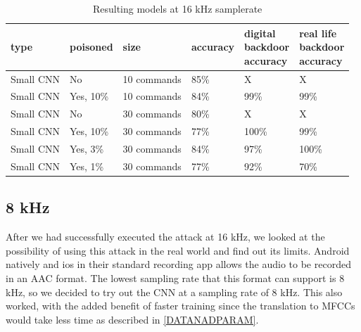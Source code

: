 \documentclass{report}
\theoremstyle{definition}
\theoremstyle{remark}
\begin{document}
\begin{table}[!hbt]
\centering
\begin{tabular}{|l|l|l|l|l|l|}
\hline
type & poisoned & size & accuracy &  \thead{digital \\ backdoor \\ accuracy} & \thead{real life \\ backdoor \\ accuracy} \\ \hline
Small CNN & No  &  10 commands  &  85\% & X & X \\ \hline
Small CNN & Yes, 10\%  &  10 commands  & 84\% & 99\% & 99\% \\ \hline
Small CNN & No  &  30 commands  &   80\%  & X   & X \\ \hline
Small CNN & Yes, 10\%  &  30 commands  &  77\% & 100\% & 99\%     \\ \hline
Small CNN & Yes, 3\%  &  30 commands  &  84\%  & 97\%  & 100\%  \\ \hline
Small CNN & Yes, 1\%  &  30 commands  &  77\%  & 92\%  & 70\%  \\ \hline
\end{tabular}
\caption{Resulting models at 16 kHz samplerate}
\end{table}

\subsection{8 kHz}
After we had successfully executed the attack at 16 kHz, we looked at the possibility of using this attack in the real world and find  out its limits. Android natively \cite{AndroidMediaRecorder} and ios in their standard recording app \cite{Zeng_2019} allows the audio to be recorded in an AAC format. The lowest sampling rate that this format can support is 8 kHz, so we decided to try out the CNN at a sampling rate of 8 kHz. This also worked, with the added benefit of faster training since the translation to MFCCs would take less time as described in \ref{DATANADPARAM}.
\end{document}
